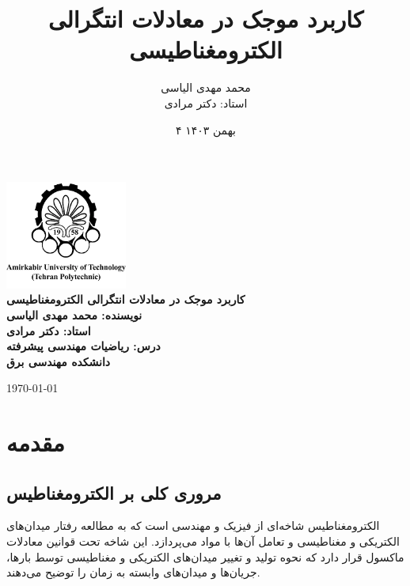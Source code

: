 \documentclass[12pt,a4paper]{article}
\title{کاربرد موجک در معادلات انتگرالی الکترومغناطیسی}
\author{محمد مهدی الیاسی \\ استاد: دکتر مرادی}
\date{۴ بهمن ۱۴۰۳}
\begin{document}
\begin{center}
    \includegraphics[width=0.3\textwidth]{amirkabir.png} \\[2em]
    \LARGE \textbf{کاربرد موجک در معادلات انتگرالی الکترومغناطیسی} \\[1em]
    \large \textbf{نویسنده: محمد مهدی الیاسی} \\[1em]
    \large \textbf{استاد: دکتر مرادی}\\[1em]
    \large \textbf{درس: ریاضیات مهندسی پیشرفته} \\[4em]
    \large \textbf{دانشکده مهندسی برق} \\[2em]
\end{center}

\vfill
\begin{center}
    \large \today
\end{center}

\newpage

\tableofcontents
\newpage

\section{مقدمه}

\subsection{مروری کلی بر الکترومغناطیس}
الکترومغناطیس شاخه‌ای از فیزیک و مهندسی است که به مطالعه رفتار میدان‌های الکتریکی و مغناطیسی و تعامل آن‌ها با مواد می‌پردازد. این شاخه تحت قوانین معادلات ماکسول قرار دارد که نحوه تولید و تغییر میدان‌های الکتریکی و مغناطیسی توسط بارها، جریان‌ها و میدان‌های وابسته به زمان را توضیح می‌دهند.
\end{document}
